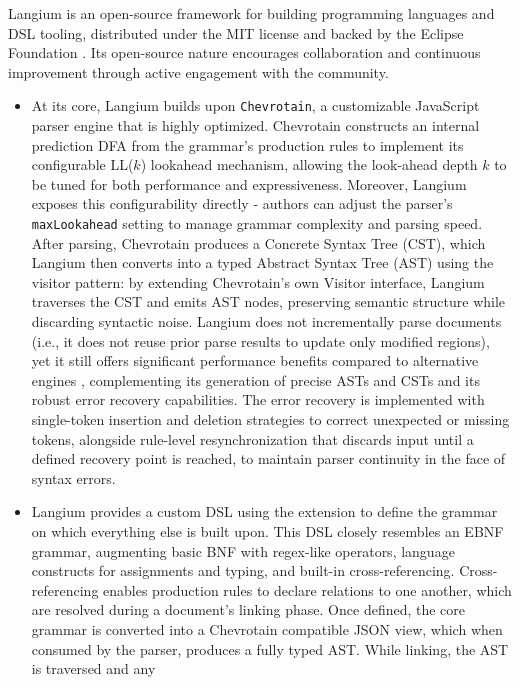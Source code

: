 Langium is an open-source framework for building programming languages and DSL tooling, distributed under the MIT license and backed by the Eclipse Foundation \cite{LangiumGit}.
Its open-source nature encourages collaboration and continuous improvement through active engagement with the community.
\begin{multicols}{2}
  \begin{itemize}
    \item At its core, Langium builds upon \verb|Chevrotain|, a customizable JavaScript parser engine that is highly optimized. Chevrotain constructs an internal prediction DFA \cite{sujew2022enabling}
          from the grammar's production rules to implement its configurable LL($k$) lookahead mechanism, allowing the look-ahead depth $k$ to be tuned for both performance and
          expressiveness. Moreover, Langium exposes this configurability directly - authors can adjust the parser's \verb|maxLookahead| setting to manage grammar complexity and
          parsing speed. After parsing, Chevrotain produces a Concrete Syntax Tree (CST), which Langium then converts into a typed Abstract Syntax Tree (AST) using the visitor pattern:
          by extending Chevrotain's own Visitor interface, Langium traverses the CST and emits AST nodes, preserving semantic structure while discarding syntactic noise.
          Langium does not incrementally parse documents (i.e., it does not reuse prior parse results to update only modified regions), yet it still offers significant performance
          benefits compared to alternative engines \cite{Chevrotain}, complementing its generation of precise ASTs and CSTs and its robust error recovery capabilities. The error recovery is
          implemented with single-token insertion and deletion strategies to correct unexpected or missing tokens, alongside rule-level resynchronization that discards input until a defined
          recovery point is reached, to maintain parser continuity in the face of syntax errors.
    \item Langium provides a custom DSL using the  extension to define the grammar on which everything else is built upon. This DSL closely resembles an EBNF grammar,
          augmenting basic BNF with regex-like operators, language constructs for assignments and typing, and built-in cross-referencing. Cross-referencing enables production rules to declare relations to one another, which are resolved during a document's linking phase.
          Once defined, the core grammar is converted into a Chevrotain compatible JSON view, which when consumed by the parser, produces a fully typed AST. While linking, the AST is traversed and any

\end{itemize}
\end{multicols}
